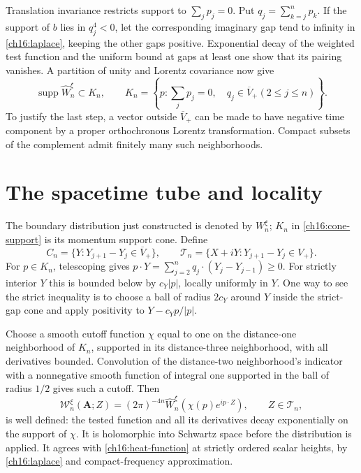Translation invariance restricts support to $\sum_jp_j=0$. Put
$q_j=\sum_{k=j}^np_k$. If the support of $b$ lies in $q_j^4<0$,
let the corresponding imaginary gap tend to infinity in
\eqref{ch16:laplace}, keeping the other gaps positive. Exponential decay
of the weighted test function and the uniform bound at gaps at least one show that its
pairing vanishes. A partition of unity and Lorentz covariance now give
\begin{equation}
 \operatorname{supp}\widehat W_n^\xi\subset K_n,
 \qquad K_n=\left\{p:\sum_jp_j=0,\quad q_j\in\overline V_+ (2\le j\le n)\right\}.
 \label{ch16:cone-support}
\end{equation}
To justify the last step, a vector outside $\overline V_+$ can be made
to have negative time component by a proper orthochronous Lorentz
transformation. Compact subsets of the complement admit finitely many
such neighborhoods.

\section{The spacetime tube and locality}
\label{ch16:locality-section}

The boundary distribution just constructed is denoted by $W_n^\xi$;
$K_n$ in \eqref{ch16:cone-support} is its momentum support cone. Define
\[
 C_n=\{Y:Y_{j+1}-Y_j\in\overline V_+\},\qquad
 \mathcal T_n=\{X+iY:Y_{j+1}-Y_j\in V_+\}.
\]
For $p\in K_n$, telescoping gives
$p\cdot Y=\sum_{j=2}^nq_j\cdot(Y_j-Y_{j-1})\ge0$.
For strictly interior $Y$ this is bounded below by $c_Y|p|$, locally
uniformly in $Y$. One way to see the strict inequality is to choose a ball
of radius $2c_Y$ around $Y$ inside the strict-gap cone and apply positivity
to $Y-c_Yp/|p|$.

Choose a smooth cutoff function $\chi$ equal to one on the distance-one neighborhood
of $K_n$, supported in its distance-three neighborhood, with all derivatives
bounded. Convolution of the distance-two neighborhood's indicator with
a nonnegative smooth function of integral one supported in the ball
of radius $1/2$ gives such a cutoff. Then
\begin{equation}
 \mathcal W_n^\xi(\boldsymbol A;Z)
   =(2\pi)^{-4n}\widehat W_n^\xi
                    \left(\chi(p)e^{ip\cdot Z}\right),\qquad Z\in\mathcal T_n,
 \label{ch16:full-tube}
\end{equation}
is well defined: the tested function and all its derivatives decay
exponentially on the support of $\chi$. It is holomorphic into Schwartz
space before the distribution is applied. It agrees with
\eqref{ch16:heat-function} at strictly ordered scalar heights, by
\eqref{ch16:laplace} and compact-frequency approximation.

